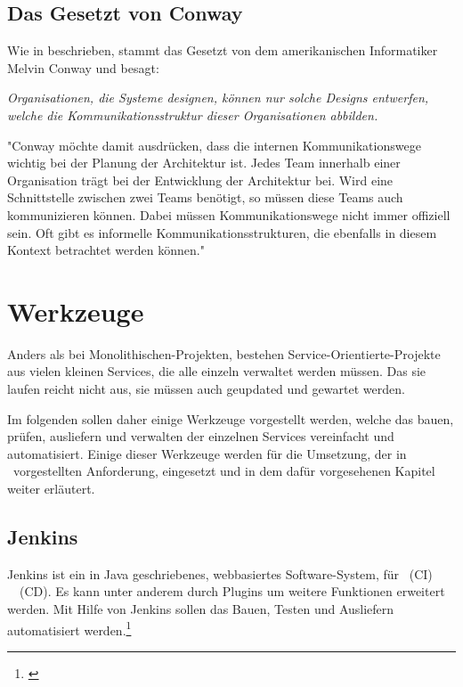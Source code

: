 \subsection{Das Gesetzt von Conway}
\label{subsec:conway}
Wie in \cite[S. 39 ff.]{EWolff2016:Microservices} beschrieben, stammt das Gesetzt von dem amerikanischen Informatiker Melvin Conway und besagt:
\begin{center}
    \textit{Organisationen, die Systeme designen, können nur solche Designs entwerfen, welche die Kommunikationsstruktur dieser Organisationen abbilden.}
\end{center}
"Conway möchte damit ausdrücken, dass die internen Kommunikationswege wichtig bei der Planung der Architektur ist. Jedes Team innerhalb einer Organisation trägt bei der Entwicklung der Architektur bei. Wird eine Schnittstelle zwischen zwei Teams benötigt, so müssen diese Teams auch kommunizieren können. Dabei müssen Kommunikationswege nicht immer offiziell sein. Oft gibt es informelle Kommunikationsstrukturen, die ebenfalls in diesem Kontext betrachtet werden können." \cite[vg. S. 39]{EWolff2016:Microservices}

\section{Werkzeuge}
\label{sec:werkzeuge}
Anders als bei Monolithischen-Projekten, bestehen Service-Orientierte-Projekte aus vielen kleinen Services, die alle einzeln verwaltet werden müssen. Das sie laufen reicht nicht aus, sie müssen auch geupdated und gewartet werden.

Im folgenden sollen daher einige Werkzeuge vorgestellt werden, welche das bauen, prüfen, ausliefern und verwalten der einzelnen Services vereinfacht und automatisiert. Einige dieser Werkzeuge werden für die Umsetzung, der in \ vorgestellten Anforderung, eingesetzt und in dem dafür vorgesehenen Kapitel weiter erläutert.

\subsection{Jenkins}
\label{subsec:jenkins}
Jenkins ist ein in Java geschriebenes, webbasiertes Software-System, für \ci\ (CI) \ \cd\ (CD). Es kann unter anderem durch Plugins um weitere Funktionen erweitert werden. Mit Hilfe von Jenkins sollen das Bauen, Testen und Ausliefern automatisiert werden.\footnote{\cite[vgl. S. 98 ff.]{EWolff2015:ContinuouosDelivery}}


